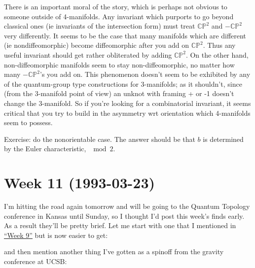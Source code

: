 \documentclass{article}
\def\tightlist{}
\renewcommand{\texttt}[1]{%
  \begingroup
  \ttfamily
  \begingroup\lccode`~=`/\lowercase{\endgroup\def~}{/\discretionary{}{}{}}%
  \begingroup\lccode`~=`[\lowercase{\endgroup\def~}{[\discretionary{}{}{}}%
  \begingroup\lccode`~=`.\lowercase{\endgroup\def~}{.\discretionary{}{}{}}%
  \catcode`/=\active\catcode`[=\active\catcode`.=\active
  \scantokens{#1\noexpand}%
  \endgroup
}
\begin{document}
There is an important moral of the story, which is perhaps not obvious
to someone outside of 4-manifolds. Any invariant which purports to go
beyond classical ones (ie invariants of the intersection form) must
treat \(\mathbb{CP}^2\) and \(-\mathbb{CP}^2\) very differently. It
seems to be the case that many manifolds which are different (ie
nondiffeomorphic) become diffeomorphic after you add on
\(\mathbb{CP}^2\). Thus any useful invariant should get rather
obliterated by adding \(\mathbb{CP}^2\). On the other hand,
non-diffeomorphic manifolds seem to stay non-diffeomorphic, no matter
how many \(-\mathbb{CP}^2\)'s you add on. This phenomenon doesn't seem
to be exhibited by any of the quantum-group type constructions for
3-manifolds; as it shouldn't, since (from the 3-manifold point of view)
an unknot with framing + or -1 doesn't change the 3-manifold. So if
you're looking for a combinatorial invariant, it seems critical that you
try to build in the asymmetry wrt orientation which 4-manifolds seem to
possess.

Exercise: do the nonorientable case. The answer should be that \(b\) is
determined by the Euler characteristic, \(\mod 2\).
\hypertarget{week11}{%
\section{Week 11 (1993-03-23)}\label{week11}}

I'm hitting the road again tomorrow and will be going to the Quantum
Topology conference in Kansas until Sunday, so I thought I'd post this
week's finds early. As a result they'll be pretty brief. Let me start
with one that I mentioned in \protect\hyperlink{week9}{``Week 9''} but
is now easier to get:


and then mention another thing I've gotten as a spinoff from the gravity
conference at UCSB:

\end{document}
